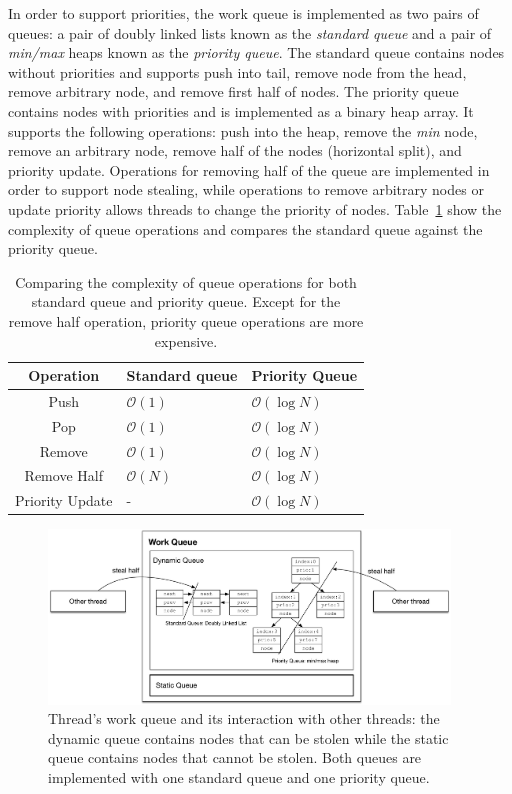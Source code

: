 In order to support priorities, the work queue is implemented as two pairs of
queues: a pair of doubly linked lists known as the \emph{standard queue} and a
pair of \emph{min/max} heaps known as the \emph{priority queue}.  The standard
queue contains nodes without priorities and supports push into tail, remove node
from the head, remove arbitrary node, and remove first half of nodes.  The
priority queue contains nodes with priorities and is implemented as a binary
heap array. It supports the following operations: push into the heap, remove the
\emph{min} node, remove an arbitrary node, remove half of the nodes (horizontal
split), and priority update.  Operations for removing half of the queue are
implemented in order to support node stealing, while operations to remove
arbitrary nodes or update priority allows threads to change the priority of
nodes. Table~\ref{fig:implementation:table_queue} show the complexity of queue
operations and compares the standard queue against the priority queue.

\begin{table}[h]
   \begin{tabular}{| c | l | l |}
      \hline
      \textbf{Operation} & \textbf{Standard queue} & \textbf{Priority Queue} \\
      \hline
      Push & $\mathcal{O}(1)$ & $\mathcal{O}(\log{N})$ \\ \hline
      Pop & $\mathcal{O}(1)$ & $\mathcal{O}(\log{N})$ \\ \hline
      Remove & $\mathcal{O}(1)$ & $\mathcal{O}(\log{N})$ \\ \hline
      Remove Half & $\mathcal{O}(N)$ & $\mathcal{O}(\log{N})$ \\ \hline
      Priority Update & - & $\mathcal{O}(\log{N})$ \\ \hline
   \end{tabular}
   \caption{Comparing the complexity of queue operations for both standard
      queue and priority queue. Except for the remove half operation, priority
      queue operations are more expensive.}
   \label{fig:implementation:table_queue}
\end{table}

\begin{figure}[t]
\centering
\includegraphics[width=0.95\textwidth]{figures/implementation/work_queue.pdf}
\caption{Thread's work queue and its interaction with other threads: the dynamic queue contains nodes that can be
   stolen while the static queue contains nodes that cannot be stolen. Both
   queues are implemented with one standard queue and one priority queue.}
\label{fig:implementation:work_queue}
\end{figure}

